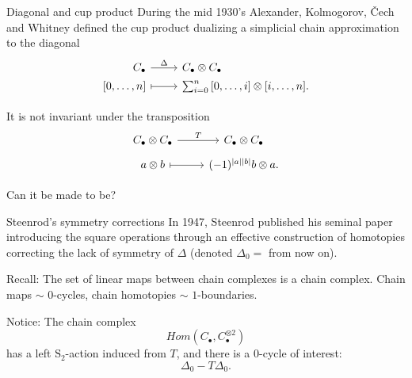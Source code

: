 \documentclass[10pt,t]{beamer} %
\renewcommand{\S}{\mathrm{S}}
\begin{document}
\begin{frame}[fragile]{Diagonal and cup product}
	During the mid 1930's Alexander, Kolmogorov, \v{C}ech and Whitney defined the cup product dualizing a simplicial chain approximation to the diagonal
	\begin{equation*}
	\begin{tikzcd}[%
	,row sep = 0ex
	,/tikz/column 1/.append style={anchor=base east}
	,/tikz/column 2/.append style={anchor=base west}
	]
	C_\bullet \arrow[r, "\Delta"] & C_\bullet \otimes C_\bullet \\
	{[0, \dots, n]} \arrow[r, |->] & \sum_{i=0}^{n} {[0, \dots, i] \otimes [i, \dots, n]}.
	\end{tikzcd}
	\end{equation*}

	\pause \vspace*{10pt}

	It is not invariant under the transposition
	\begin{equation*}
	\begin{tikzcd}[row sep = tiny]
	C_\bullet \otimes C_\bullet \arrow[r, "T"] & C_\bullet \otimes C_\bullet \\
	a \otimes b \arrow[r, |->]& (-1)^{|a||b|} b \otimes a.
	\end{tikzcd}
	\end{equation*}
	
	\vspace*{10pt}\pause
	
	\textcolor{pblue}{Can it be made to be?}
\end{frame}


\begin{frame}{Steenrod's symmetry corrections}
	In 1947, Steenrod published his seminal paper introducing the square operations through an effective construction of homotopies correcting the lack of symmetry of $\Delta$ (denoted $\Delta_0 = $ from now on).

	\vspace*{15pt} \pause

	\textcolor{pblue}{Recall:} The set of linear maps between chain complexes is a chain complex.
	Chain maps $\sim$ $0$-cycles, chain homotopies $\sim$ $1$-boundaries.

	\vspace*{15pt}\pause

	\textcolor{pblue}{Notice:} The chain complex
	\begin{equation*} \label{eq: complex of maps to the tensor product}
	Hom\left(C_\bullet, C_\bullet^{\otimes 2}  \right)
	\end{equation*}
	has a left $\S_2$-action induced from $T$, and there is a $0$-cycle of interest:
	\begin{equation*}
	\Delta_0 - T \Delta_0.
	\end{equation*}
\end{frame}
\end{document}
